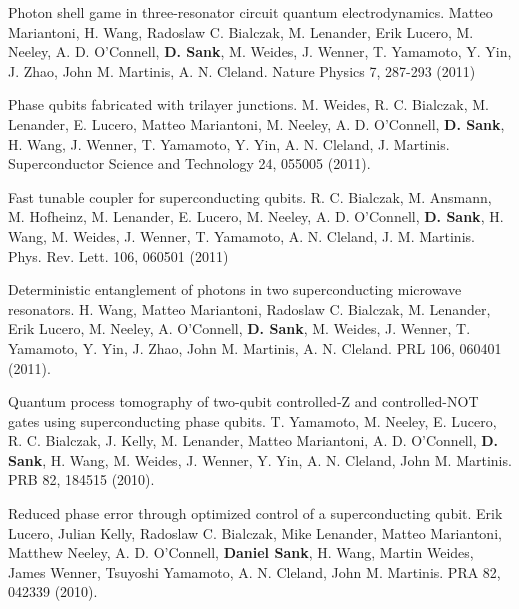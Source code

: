 \documentclass[margin=2cm,line]{res}
\begin{document}
\begin{resume}
\begin{list3}
\item Photon shell game in three-resonator circuit quantum electrodynamics. Matteo Mariantoni, H. Wang, Radoslaw C. Bialczak, M. Lenander, Erik Lucero, M. Neeley, A. D. O'Connell, \textbf{D. Sank}, M. Weides, J. Wenner, T. Yamamoto, Y. Yin, J. Zhao, John M. Martinis, A. N. Cleland. Nature Physics 7, 287-293 (2011) \\

\item Phase qubits fabricated with trilayer junctions. M. Weides, R. C. Bialczak, M. Lenander, E. Lucero, Matteo Mariantoni, M. Neeley, A. D. O'Connell, \textbf{D. Sank}, H. Wang, J. Wenner, T. Yamamoto, Y. Yin, A. N. Cleland, J. Martinis. Superconductor Science and Technology 24, 055005 (2011). \\

\item Fast tunable coupler for superconducting qubits. R. C. Bialczak, M. Ansmann, M. Hofheinz, M. Lenander, E. Lucero, M. Neeley, A. D. O'Connell, \textbf{D. Sank}, H. Wang, M. Weides, J. Wenner, T. Yamamoto, A. N. Cleland, J. M. Martinis. Phys. Rev. Lett. 106, 060501 (2011) \\

\item Deterministic entanglement of photons in two superconducting microwave resonators. H. Wang, Matteo Mariantoni, Radoslaw C. Bialczak, M. Lenander, Erik Lucero, M. Neeley, A. O'Connell, \textbf{D. Sank}, M. Weides, J. Wenner, T. Yamamoto, Y. Yin, J. Zhao, John M. Martinis, A. N. Cleland. PRL 106, 060401 (2011). \\

\item Quantum process tomography of two-qubit controlled-Z and controlled-NOT gates using superconducting phase qubits. T. Yamamoto, M. Neeley, E. Lucero, R. C. Bialczak, J. Kelly, M. Lenander, Matteo Mariantoni, A. D. O'Connell, \textbf{D. Sank}, H. Wang, M. Weides, J. Wenner, Y. Yin, A. N. Cleland, John M. Martinis. PRB 82, 184515 (2010). \\

\end{list3}

\pagebreak

\begin{list3}

\item Reduced phase error through optimized control of a superconducting qubit. Erik Lucero, Julian Kelly, Radoslaw C. Bialczak, Mike Lenander, Matteo Mariantoni, Matthew Neeley, A. D. O'Connell, \textbf{Daniel Sank}, H. Wang, Martin Weides, James Wenner, Tsuyoshi Yamamoto, A. N. Cleland, John M. Martinis. PRA 82, 042339 (2010). \\


\end{list3}
\end{resume}
\end{document}
